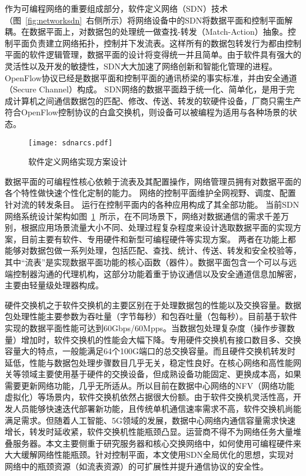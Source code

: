 作为可编程网络的重要组成部分，软件定义网络（SDN）技术（图~\ref{fig:networksdn}~右侧所示）将网络设备中的SDN将数据平面和控制平面解耦。在数据平面上，对数据包的处理统一做查找-转发（Match-Action）抽象。控制平面负责建立网络拓扑，控制并下发流表。这样所有的数据包转发行为都由控制平面的软件逻辑管理，数据平面的设计将变得统一并且简单。由于软件具有强大的灵活性以及开发的敏捷性，SDN大大加速了网络创新和智能化管理的进程。OpenFlow协议已经是数据平面和控制平面的通讯桥梁的事实标准，并由安全通道（Secure Channel）构成。
SDN网络的数据平面趋于统一化、简单化，是用于完成计算机之间通信数据包的匹配、修改、传送、转发的软硬件设备，厂商只需生产符合OpenFlow控制协议的白盒交换机，则设备可以被编程为适用与各种场景的状态。

\begin{figure}[!ht]
	\centering 
	\vspace{-1.5mm} 
	\texttt{[image: sdnarcs.pdf]}
	\caption{软件定义网络实现方案设计} \label{fig:sdnarcs}
\end{figure}

	

数据平面的可编程性核心依赖于流表及其配置操作，网络管理员拥有对数据平面的各个特性做快速个性化定制的能力。
网络的控制平面维护全网视野、调度、配置针对流的转发条目。
运行在控制平面内的各种应用构成了其全部功能。
当前SDN网络系统设计架构如图~\ref{fig:sdnarcs}~所示，在不同场景下，网络对数据通信的需求千差万别，根据应用场景流量大小不同、处理过程复杂程度来设计选取数据平面的实现方案，目前主要有软件、专用硬件和新型可编程硬件等实现方案。
两者在功能上都能够对数据包做一系列处理，包括匹配、查找、统计、传送、转发和安全校验等，其中“流表”是实现数据平面功能的核心函数（器件）。数据平面包含一个可以与远端控制器沟通的代理机构，这部分功能着重于协议通信以及安全通道信息加解密，主要由轻量级处理器构成。

硬件交换机之于软件交换机的主要区别在于处理数据包的性能以及交换容量。数据包处理性能主要参数为吞吐量（字节每秒）和包吞吐量（包每秒）。目前基于软件实现的数据平面性能可达到60Gbps/60Mpps。当数据包处理复杂度（操作步骤数量）增加时，软件交换机的性能会大幅下降。专用硬件交换机有接口数目多、交换容量大的特点，一般能满足64个100G端口的总交换容量。而且硬件交换机转发时延低，性能与数据包处理步骤数目几乎无关，稳定性良好。在核心网络和高性能网关等领域主要使用基于硬件的交换设备，但成熟设备功能固定、更换成本高，如果需要更新网络功能，几乎无所适从。所以目前在数据中心网络的NFV（网络功能虚拟化）等场景内，软件交换机依然占据很大份额。由于软件交换机灵活性高，开发人员能够快速迭代部署新功能，且传统单机通信速率需求不高，软件交换机尚能满足需求。但随着人工智能、5G领域的发展，数据中心网络内通信容量需求快速增长，转发时延收紧，软件交换机性能瓶颈凸显。运营商不得不为网络任务大量堆叠服务器。本文主要侧重于研究服务器和核心交换网络中，如何使用可编程硬件来大大缓解网络性能瓶颈。针对控制平面，本文使用SDN全局优化的思想，实现对网络中的瓶颈资源（如流表资源）的可扩展性并提升通信协议的安全性。



